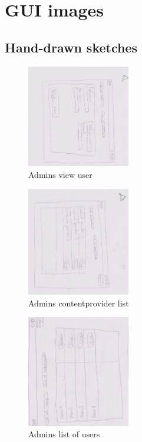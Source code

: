 \chapter{GUI images}
\label{Appendix_GUI}

\section{Hand-drawn sketches}
\label{Appendix_GUI_sketches}
\begin{figure}[!ht]
  \centering
    \includegraphics[angle=90, width=0.4\textwidth]{Parts/Appendix/Images/PaperMockup/AdminViewUser}
  \caption{Admins view user}
  \label{fig:Appendix_GUI_sketches_AdminViewUser}
\end{figure}
\begin{figure}[!ht]
  \centering
    \includegraphics[angle=90, width=0.4\textwidth]{Parts/Appendix/Images/PaperMockup/AdminListofCPs}
  \caption{Admins contentprovider list}
  \label{fig:Appendix_GUI_sketches_AdminListofCP}
\end{figure}
\begin{figure}[!ht]
  \centering
    \includegraphics[angle=90, width=0.4\textwidth]{Parts/Appendix/Images/PaperMockup/AdminListOfUsers}
  \caption{Admins list of users}
  \label{fig:Appendix_GUI_sketches_AdminListofUsers}
\end{figure}
